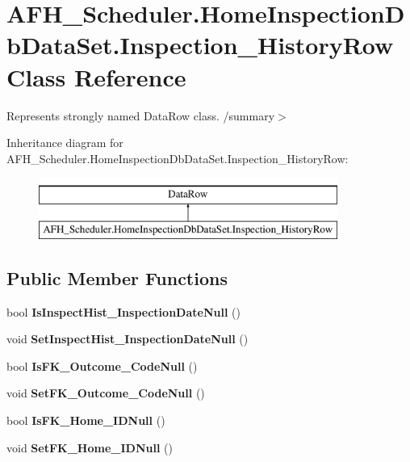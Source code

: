 \section{A\+F\+H\+\_\+\+Scheduler.\+Home\+Inspection\+Db\+Data\+Set.\+Inspection\+\_\+\+History\+Row Class Reference}
\label{class_a_f_h___scheduler_1_1_home_inspection_db_data_set_1_1_inspection___history_row}


Represents strongly named Data\+Row class. /summary$>$  


Inheritance diagram for A\+F\+H\+\_\+\+Scheduler.\+Home\+Inspection\+Db\+Data\+Set.\+Inspection\+\_\+\+History\+Row\+:\begin{figure}[H]
\begin{center}
\leavevmode
\includegraphics[height=2.000000cm]{class_a_f_h___scheduler_1_1_home_inspection_db_data_set_1_1_inspection___history_row}
\end{center}
\end{figure}
\subsection*{Public Member Functions}
\begin{DoxyCompactItemize}
\item 
\mbox{\label{class_a_f_h___scheduler_1_1_home_inspection_db_data_set_1_1_inspection___history_row_aad52b4bb377167ca8dd33e0ca1983423}} 
bool {\bfseries Is\+Inspect\+Hist\+\_\+\+Inspection\+Date\+Null} ()
\item 
\mbox{\label{class_a_f_h___scheduler_1_1_home_inspection_db_data_set_1_1_inspection___history_row_abe6398ae096cf407e4b746be8cbfd053}} 
void {\bfseries Set\+Inspect\+Hist\+\_\+\+Inspection\+Date\+Null} ()
\item 
\mbox{\label{class_a_f_h___scheduler_1_1_home_inspection_db_data_set_1_1_inspection___history_row_a823fc88849a808d76004e273c2057b3d}} 
bool {\bfseries Is\+F\+K\+\_\+\+Outcome\+\_\+\+Code\+Null} ()
\item 
\mbox{\label{class_a_f_h___scheduler_1_1_home_inspection_db_data_set_1_1_inspection___history_row_a43978b4b88f66f49b79bef42b4a38c06}} 
void {\bfseries Set\+F\+K\+\_\+\+Outcome\+\_\+\+Code\+Null} ()
\item 
\mbox{\label{class_a_f_h___scheduler_1_1_home_inspection_db_data_set_1_1_inspection___history_row_a04ca5622154ae4ddf4ed8083a19f9b34}} 
bool {\bfseries Is\+F\+K\+\_\+\+Home\+\_\+\+I\+D\+Null} ()
\item 
\mbox{\label{class_a_f_h___scheduler_1_1_home_inspection_db_data_set_1_1_inspection___history_row_ae5a2505c3de06d5b4fbcd792ce7113e0}} 
void {\bfseries Set\+F\+K\+\_\+\+Home\+\_\+\+I\+D\+Null} ()
\end{DoxyCompactItemize}
